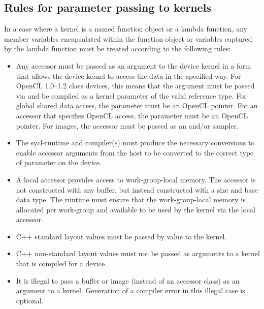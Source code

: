 \subsection{Rules for parameter passing to kernels}
\label{sec:kernel.parameter.passing}
In a case where a kernel is a named function object or a lambda function, any
member variables encapsulated within the function object or variables captured by
the lambda function must be treated according to the following rules:

\begin{itemize}
  \item
    Any accessor must be passed as an argument to the device kernel in
    a form that allows the device kernel to access the data in the
    specified way. For OpenCL 1.0--1.2 class devices, this means that
    the argument must be passed via  and be
    compiled as a kernel parameter of the valid reference type. For
    global shared data access, the parameter must be an OpenCL
     pointer. For an accessor that specifies OpenCL
     access, the parameter must be an OpenCL
     pointer. For images, the accessor must be passed as
    an  and/or sampler.

  \item
    The \gls{sycl-runtime} and compiler(s) must produce the necessary
    conversions to enable accessor arguments from the host to be
    converted to the correct type of parameter on the device.

  \item
    A local accessor provides access to work-group-local memory. The
    accessor is not constructed with any buffer, but instead
    constructed with a size and base data type. The runtime must
    ensure that the work-group-local memory is allocated per
    work-group and available to be used by the kernel via the local
    accessor.

  \item
    C++ standard layout values must be passed by value to the kernel.

  \item
    C++ non-standard layout values must not be passed as arguments to
    a kernel that is compiled for a device.

  \item
    It is illegal to pass a buffer or image (instead of an accessor
    class) as an argument to a kernel. Generation of a compiler error
    in this illegal case is optional.


\end{itemize}
